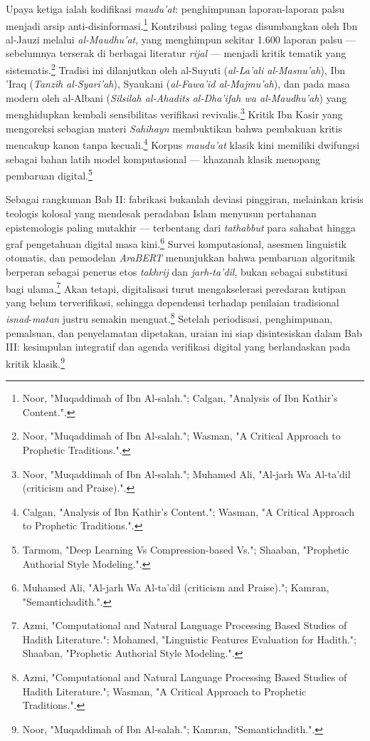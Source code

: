 Upaya ketiga ialah kodifikasi \textit{maudu'at}: penghimpunan laporan-laporan palsu menjadi arsip anti-disinformasi.\footnote{Noor, "Muqaddimah of Ibn Al-salah."; Calgan, "Analysis of Ibn Kathir's Content.".} Kontribusi paling tegas disumbangkan oleh Ibn al-Jauzi melalui \textit{al-Maudhu'at}, yang menghimpun sekitar 1.600 laporan palsu --- sebelumnya terserak di berbagai literatur \textit{rijal} --- menjadi kritik tematik yang sistematis.\footnote{Noor, "Muqaddimah of Ibn Al-salah."; Wasman, "A Critical Approach to Prophetic Traditions.".} Tradisi ini dilanjutkan oleh al-Suyuti (\textit{al-La'ali al-Masnu'ah}), Ibn 'Iraq (\textit{Tanzih al-Syari'ah}), Syaukani (\textit{al-Fawa'id al-Majmu'ah}), dan pada masa modern oleh al-Albani (\textit{Silsilah al-Ahadits al-Dha'ifah wa al-Maudhu'ah}) yang menghidupkan kembali sensibilitas verifikasi revivalis.\footnote{Noor, "Muqaddimah of Ibn Al-salah."; Muhamed Ali, "Al-jarh Wa Al-ta'dil (criticism and Praise).".} Kritik Ibn Kasir yang mengoreksi sebagian materi \textit{Sahihayn} membuktikan bahwa pembakuan kritis mencakup kanon tanpa kecuali.\footnote{Calgan, "Analysis of Ibn Kathir's Content."; Wasman, "A Critical Approach to Prophetic Traditions.".} Korpus \textit{maudu'at} klasik kini memiliki dwifungsi sebagai bahan latih model komputasional --- khazanah klasik menopang pembaruan digital.\footnote{Tarmom, "Deep Learning Vs Compression-based Vs."; Shaaban, "Prophetic Authorial Style Modeling.".}

Sebagai rangkuman Bab II: fabrikasi bukanlah deviasi pinggiran, melainkan krisis teologis kolosal yang mendesak peradaban Islam menyusun pertahanan epistemologis paling mutakhir --- terbentang dari \textit{tathabbut} para sahabat hingga graf pengetahuan digital masa kini.\footnote{Muhamed Ali, "Al-jarh Wa Al-ta'dil (criticism and Praise)."; Kamran, "Semantichadith.".} Survei komputasional, asesmen linguistik otomatis, dan pemodelan \textit{AraBERT} menunjukkan bahwa pembaruan algoritmik berperan sebagai penerus etos \textit{takhrij} dan \textit{jarh-ta'dil}, bukan sebagai substitusi bagi ulama.\footnote{Azmi, "Computational and Natural Language Processing Based Studies of Hadith Literature."; Mohamed, "Linguistic Features Evaluation for Hadith."; Shaaban, "Prophetic Authorial Style Modeling.".} Akan tetapi, digitalisasi turut mengakselerasi peredaran kutipan yang belum terverifikasi, sehingga dependensi terhadap penilaian tradisional \textit{isnad}-\textit{matan} justru semakin menguat.\footnote{Azmi, "Computational and Natural Language Processing Based Studies of Hadith Literature."; Wasman, "A Critical Approach to Prophetic Traditions.".} Setelah periodisasi, penghimpunan, pemalsuan, dan penyelamatan dipetakan, uraian ini siap disintesiskan dalam Bab III: kesimpulan integratif dan agenda verifikasi digital yang berlandaskan pada kritik klasik.\footnote{Noor, "Muqaddimah of Ibn Al-salah."; Kamran, "Semantichadith.".}

